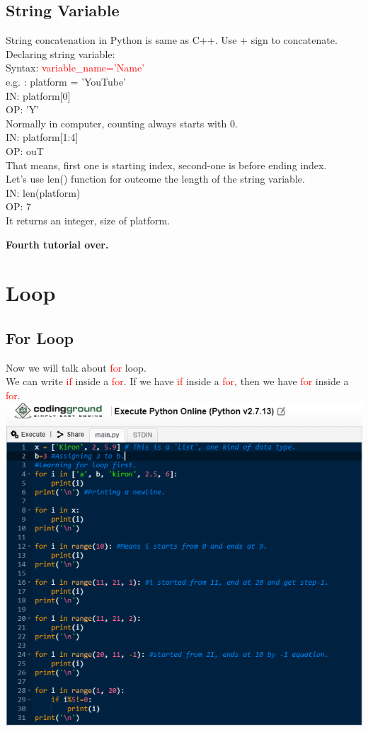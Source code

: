 \documentclass[11 pt, letterpaper]{article}
\begin{document}
\subsection{String Variable}
String concatenation in Python is same as C++. Use $+$ sign to concatenate.\\
Declaring string variable:\\
Syntax: \textcolor{red}{variable\_name='Name'}\\
e.g. : platform = 'YouTube'\\
IN: platform[0]\\
OP: 'Y'\\
Normally in computer, counting always starts with 0.\\
IN: platform[1:4]\\
OP: ouT\\
That means, first one is starting index, second-one is before ending index.\\
Let's use len() function for outcome the length of the string variable.\\
IN: len(platform)\\
OP: 7\\
It returns an integer, size of platform.\\
\begin{flushright}
\textbf{Fourth tutorial over.}
\end{flushright}

\section{Loop}
\subsection{For Loop}
Now we will talk about \textcolor{red}{for} loop.\\
We can write \textcolor{red}{if} inside a \textcolor{red}{for}. If we have \textcolor{red}{if} inside a \textcolor{red}{for}, then we have \textcolor{red}{for} inside a \textcolor{red}{for}.\\
\includegraphics[width=260 px, height=230 px]{For Loop practice.png}
\end{document}
